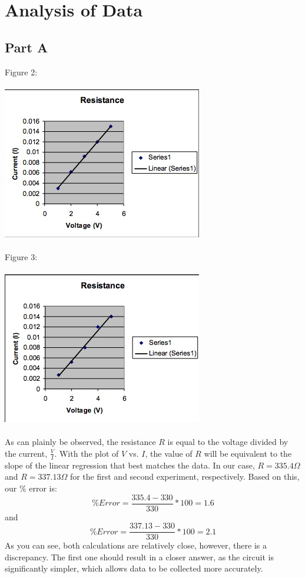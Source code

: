 \documentclass[titlepage]{article}
\begin{document}
\section{Analysis of Data}\label{sec:analysis_of_data}

\subsection{Part A}\label{sub:part_a-analysis}
Figure 2:\\
\\
\includegraphics{1.jpg}
\\
\\
\newpage
Figure 3:\\
\\
\includegraphics{2.jpg}
\\
\\
As can plainly be observed, the resistance $R$ is equal to the voltage divided by the current, $\frac{V}{I}$. With the plot of $V$ vs. $I$, the value of $R$ will be equivalent to the slope of the linear regression that best matches the data. In our case, $R = 335.4 \Omega$ and $R = 337.13 \Omega$ for the first and second experiment, respectively. Based on this, our \% error is:
\[
	\% Error = \frac{335.4 - 330}{330} * 100 = 1.6 %
\]
and
\[
	\% Error = \frac{337.13 - 330}{330} * 100 = 2.1 %
\]
As you can see, both calculations are relatively close, however, there is a discrepancy. The first one should result in a closer answer, as the circuit is significantly simpler, which allows data to be collected more accurately.
\end{document}
